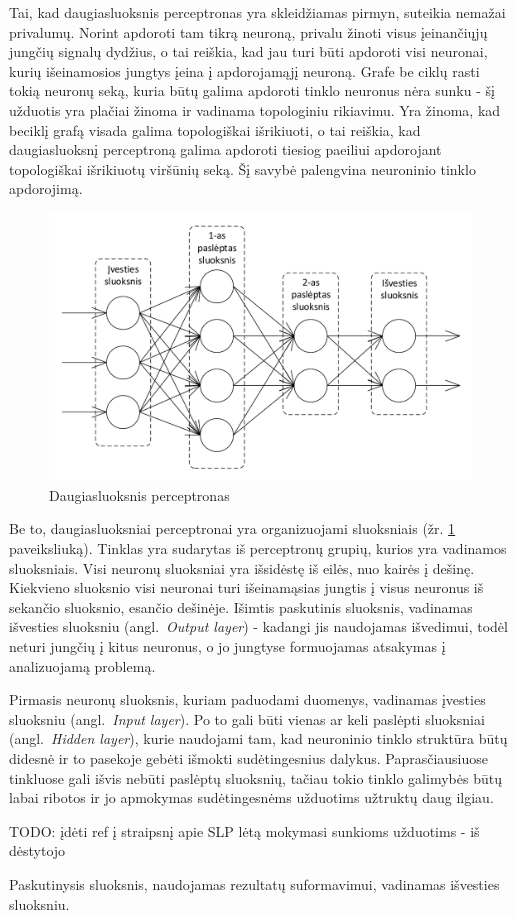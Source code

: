 \documentclass{VUMIFPSbakalaurinis}
\newcommand{\TODO}[1]{
\colorbox{todo-background-color}{TODO: #1}
}
\begin{document}
Tai, kad daugiasluoksnis perceptronas yra skleidžiamas pirmyn, suteikia nemažai privalumų.
Norint apdoroti tam tikrą neuroną, privalu žinoti visus įeinančiųjų jungčių signalų dydžius, o tai reiškia, kad jau turi būti apdoroti visi neuronai, kurių išeinamosios jungtys įeina į apdorojamąjį neuroną.
Grafe be ciklų rasti tokią neuronų seką, kuria būtų galima apdoroti tinklo neuronus nėra sunku - šį užduotis yra plačiai žinoma ir vadinama topologiniu rikiavimu.
Yra žinoma, kad beciklį grafą visada galima topologiškai išrikiuoti, o tai reiškia, kad daugiasluoksnį perceptroną galima apdoroti tiesiog paeiliui apdorojant topologiškai išrikiuotų viršūnių seką.
Šį savybė palengvina neuroninio tinklo apdorojimą.

\begin{figure}
	\includegraphics[scale=0.75]{diagrams/2_neural_network}
	\caption{Daugiasluoksnis perceptronas}
	\label{fig:neural_network}
\end{figure}

Be to, daugiasluoksniai perceptronai yra organizuojami sluoksniais (žr. \ref{fig:neural_network} paveiksliuką).
Tinklas yra sudarytas iš perceptronų grupių, kurios yra vadinamos sluoksniais.
Visi neuronų sluoksniai yra išsidėstę iš eilės, nuo kairės į dešinę.
Kiekvieno sluoksnio visi neuronai turi išeinamąsias jungtis į visus neuronus iš sekančio sluoksnio, esančio dešinėje.
Išimtis paskutinis sluoksnis, vadinamas išvesties sluoksniu (angl.~\textit{Output layer}) - kadangi jis naudojamas išvedimui, todėl neturi jungčių į kitus neuronus, o jo jungtyse formuojamas atsakymas į analizuojamą problemą.

Pirmasis neuronų sluoksnis, kuriam paduodami duomenys, vadinamas įvesties sluoksniu (angl.~\textit{Input layer}).
Po to gali būti vienas ar keli paslėpti sluoksniai (angl.~\textit{Hidden layer}), kurie naudojami tam, kad neuroninio tinklo struktūra būtų didesnė ir to pasekoje gebėti išmokti sudėtingesnius dalykus.
Paprasčiausiuose tinkluose gali išvis nebūti paslėptų sluoksnių, tačiau tokio tinklo galimybės būtų labai ribotos ir jo apmokymas sudėtingesnėms užduotims užtruktų daug ilgiau.
\TODO{įdėti ref į straipsnį apie SLP lėtą mokymasi sunkioms užduotims - iš dėstytojo}
Paskutinysis sluoksnis, naudojamas rezultatų suformavimui, vadinamas išvesties sluoksniu.
\end{document}
